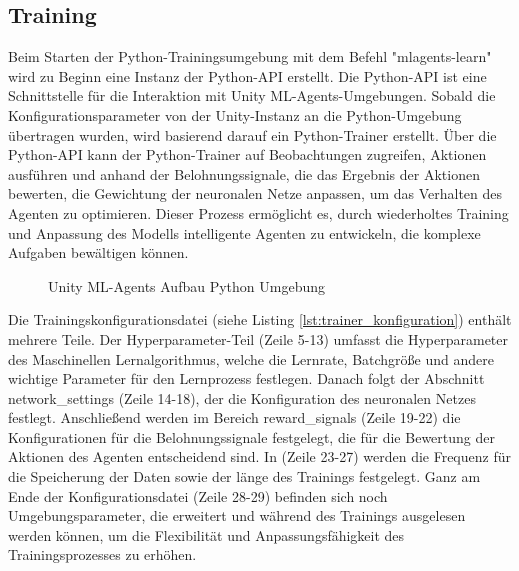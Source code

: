 \subsection{Training}
Beim Starten der Python-Trainingsumgebung mit dem Befehl "mlagents-learn" wird zu Beginn eine Instanz der Python-API erstellt. Die Python-API ist eine Schnittstelle für die Interaktion mit Unity ML-Agents-Umgebungen. Sobald die Konfigurationsparameter von der Unity-Instanz an die Python-Umgebung übertragen wurden, wird basierend darauf ein Python-Trainer erstellt. Über die Python-API kann der Python-Trainer auf Beobachtungen zugreifen, Aktionen ausführen und anhand der Belohnungssignale, die das Ergebnis der Aktionen bewerten, die Gewichtung der neuronalen Netze anpassen, um das Verhalten des Agenten zu optimieren. Dieser Prozess ermöglicht es, durch wiederholtes Training und Anpassung des Modells intelligente Agenten zu entwickeln, die komplexe Aufgaben bewältigen können.

\begin{figure}[H]
  \centering  
  \caption{Unity ML-Agents Aufbau Python Umgebung}
  \label{fig:mlagents_aufbau_python}
\end{figure}

Die Trainingskonfigurationsdatei (siehe Listing \ref{lst:trainer_konfiguration}) enthält mehrere Teile. Der Hyperparameter-Teil (Zeile 5-13) umfasst die Hyperparameter des Maschinellen Lernalgorithmus, welche die Lernrate, Batchgröße und andere wichtige Parameter für den Lernprozess festlegen. Danach folgt der Abschnitt network\_settings (Zeile 14-18), der die Konfiguration des neuronalen Netzes festlegt. Anschließend werden im Bereich reward\_signals (Zeile 19-22) die Konfigurationen für die Belohnungssignale festgelegt, die für die Bewertung der Aktionen des Agenten entscheidend sind. In (Zeile 23-27) werden die Frequenz für die Speicherung der Daten sowie der länge des Trainings festgelegt. Ganz am Ende der Konfigurationsdatei (Zeile 28-29) befinden sich noch Umgebungsparameter, die erweitert und während des Trainings ausgelesen werden können, um die Flexibilität und Anpassungsfähigkeit des Trainingsprozesses zu erhöhen.

